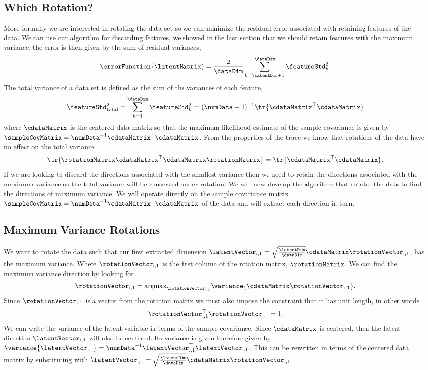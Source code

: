 \subsection{Which Rotation?}

More formally we are interested in rotating the data set so we can
minimize the residual error associated with retaining features of the
data. We can use our algorithm for discarding features, we showed in
the last section that we should retain features with the maximum
variance, the error is then given by the sum of residual variances,
\[
\errorFunction\left(\latentMatrix\right)=\frac{2}{\dataDim}
\sum_{k=\latentDim+1}^{\dataDim}\featureStd_{k}^{2}.
\]
The total variance of a data set is defined as the sum of the variances of each feature,
\[
\featureStd_\text{total}^2 = \sum_{k=1}^\dataDim \featureStd_k^2 = (\numData-1)^{-1}\tr{\cdataMatrix^\top \cdataMatrix}
\]
where $\cdataMatrix$ is the centered data matrix so that the maximum likelihood estimate of the sample
covariance is given by
$\sampleCovMatrix=\numData^{-1}\cdataMatrix^\top\cdataMatrix$. From the
properties of the trace we know that
rotations of the data have no effect on the total variance
\[
\tr{\rotationMatrix\cdataMatrix^\top\cdataMatrix\rotationMatrix} = \tr{\cdataMatrix^\top \cdataMatrix}.
\]
If we are looking to discard the directions associated with the
smallest variance then we need to retain the directions associated
with the maximum variance as the total variance will be conserved
under rotation. We will now develop the algorithm that rotates the data
to find the directions of maximum variance. We will operate directly
on the sample covariance matrix
$\sampleCovMatrix=\numData^{-1}\cdataMatrix^{\top}\cdataMatrix$ of the
data and will extract each direction in turn.

\subsection{Maximum Variance Rotations}

We want to rotate the data such that our first extracted dimension
$\latentVector_{:,1}=\sqrt{\frac{\latentDim}{\dataDim}}\cdataMatrix\rotationVector_{:,1}$,
has the maximum variance. Where $\rotationVector_{:,1}$ is the first column of the rotation matrix, $\rotationMatrix$. We can find the maximum variance direction by looking for 
\[
\rotationVector_{:, 1}  =  \text{argmax}_{\rotationVector_{:, 1}}\variance{\cdataMatrix\mathbf{\rotationVector_{:, 1}}}.
\]
Since $\rotationVector_{:, 1}$ is a vector from the rotation matrix we must also impose the constraint that it has unit length, in other words
\[  
\rotationVector_{:, 1}^{\top}\rotationVector_{:, 1}=1.
\]
We can write the variance of the latent variable in terms of the
sample covariance. Since $\cdataMatrix$ is centered, then the latent
direction $\latentVector_{:,1}$ will also be centered. Its variance is
given therefore given by $\variance{\latentVector_{:, 1}} =
\numData^{-1}\latentVector_{:, 1}^\top \latentVector_{:, 1}$. This can
be rewritten in terms of the centered data matrix by substituting with
$\latentVector_{:, 1}=\sqrt{\frac{\latentDim}{\dataDim}}\cdataMatrix\rotationVector_{:, 1}$

